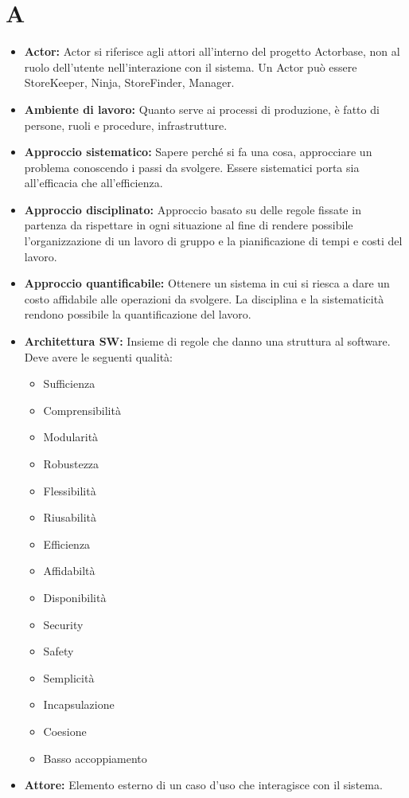 \documentclass[a4paper]{report}
\newcommand{\mychapter}[2]{
	\setcounter{chapter}{#1}
	\setcounter{section}{0}
	\setcounter{subsection}{1}
	\chapter*{#2}
	\addcontentsline{toc}{chapter}{#2}
}
\begin{document}
	\mychapter{1}{A}
		\begin{itemize}
			\item \textbf{Actor:} Actor si riferisce agli attori all'interno del progetto Actorbase, 
			non al ruolo dell'utente nell'interazione con il sistema. Un Actor può essere StoreKeeper, 
			Ninja, StoreFinder, Manager.
			\item \textbf{Ambiente di lavoro:} Quanto serve ai processi di produzione, è fatto di persone, 
			ruoli e procedure, infrastrutture.
			\item \textbf{Approccio sistematico:} Sapere perché si fa una cosa, approcciare un problema 
			conoscendo i passi da svolgere. Essere sistematici porta sia all’efficacia che all’efficienza.
			\item \textbf{Approccio disciplinato:} Approccio basato su delle regole fissate in partenza da 
			rispettare in ogni situazione al fine di rendere possibile l’organizzazione di un lavoro di gruppo 
			e la pianificazione di tempi e costi del lavoro.
			\item \textbf{Approccio quantificabile:} Ottenere un sistema in cui si riesca a dare un costo 
			affidabile alle operazioni da svolgere. La disciplina e la sistematicità rendono possibile la 
			quantificazione del lavoro.
			\item \textbf{Architettura SW:} Insieme di regole che danno una struttura al software. Deve avere le seguenti qualità:
			\begin{itemize}
				\item  Sufficienza
				\item  Comprensibilità
				\item  Modularità
				\item  Robustezza 
				\item  Flessibilità
				\item  Riusabilità
				\item  Efficienza
				\item  Affidabiltà
				\item  Disponibilità
				\item  Security
				\item  Safety
				\item  Semplicità
				\item  Incapsulazione
				\item  Coesione
				\item  Basso accoppiamento
			\end{itemize}
			\item \textbf{Attore:} Elemento esterno di un caso d'uso che interagisce con il sistema. 
		\end{itemize}
		
\end{document}
